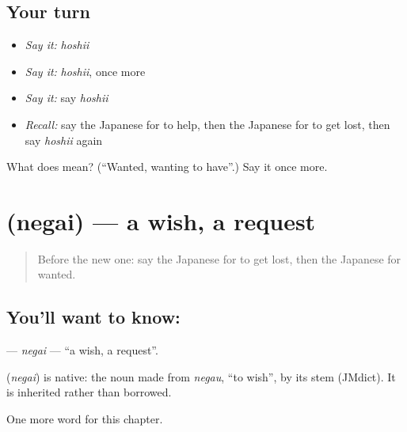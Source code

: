 \subsection*{Your turn}
\begin{itemize}
\raggedright
  \item \emph{Say it:} \emph{hoshii}
  \item \emph{Say it:} \emph{hoshii}, once more
  \item \emph{Say it:} say \emph{hoshii}
  \item \emph{Recall:} say the Japanese for to help, then the Japanese for to get lost, then say \emph{hoshii} again
\end{itemize}

\begin{tcolorbox}[breakable,colback=teal!4,colframe=teal!35!black,title={Before you move on}]
What does  mean? (\textquotedblleft{}Wanted, wanting to have\textquotedblright{}.) Say it once more.
\end{tcolorbox}
\section[\texorpdfstring{\ja{ねがい} (negai)}{ねがい (negai)}]{ (negai) — a wish, a request}

\label{lesson:JA-C92-negai}



\begin{quote}
Before the new one: say the Japanese for to get lost, then the Japanese for wanted.
\end{quote}

\subsection*{You'll want to know: }
\textbf{} — \emph{negai} — \textquotedblleft{}a wish, a request\textquotedblright{}.

\begin{cousinweb}
\textbf{} (\emph{negai}) is native: the noun made from \emph{negau}, \textquotedblleft{}to wish\textquotedblright{}, by its stem (JMdict). It is inherited rather than borrowed.
\end{cousinweb}

\begin{grammarlens}[title={What you've built}]
One more word for this chapter.
\end{grammarlens}

